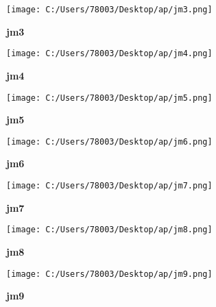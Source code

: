 \documentclass[UTF8]{report}
\theoremstyle{MyLineTheoremStyle} %
\theoremstyle{MyBlockTheoremStyle} %
\theoremstyle{MySubsubsectionStyle} %
\begin{document}
\begin{figure}[ht]
    \centering
    \texttt{[image: C:/Users/78003/Desktop/ap/jm3.png]}
    \caption{\textbf{jm3}}
    \label{fig:jm3}
\end{figure}

\begin{figure}[ht]
    \centering
    \texttt{[image: C:/Users/78003/Desktop/ap/jm4.png]}
    \caption{\textbf{jm4}}
    \label{fig:jm4}
\end{figure}

\begin{figure}
    \centering
    \texttt{[image: C:/Users/78003/Desktop/ap/jm5.png]}
    \caption{\textbf{jm5}}
    \label{fig:jm5}
\end{figure}

\begin{figure}
    \centering
    \texttt{[image: C:/Users/78003/Desktop/ap/jm6.png]}
    \caption{\textbf{jm6}}
    \label{fig:jm6}
\end{figure}

\begin{figure}
    \centering
    \texttt{[image: C:/Users/78003/Desktop/ap/jm7.png]}
    \caption{\textbf{jm7}}
    \label{fig:jm7}
\end{figure}

\begin{figure}
    \centering
    \texttt{[image: C:/Users/78003/Desktop/ap/jm8.png]}
    \caption{\textbf{jm8}}
    \label{fig:jm8}
\end{figure}

\begin{figure}
    \centering
    \texttt{[image: C:/Users/78003/Desktop/ap/jm9.png]}
    \caption{\textbf{jm9}}
    \label{fig:jm9}
\end{figure}




\chapter{}\thispagestyle{fancy} 
\section{}



\chapter{}\thispagestyle{fancy} 
\end{document}
